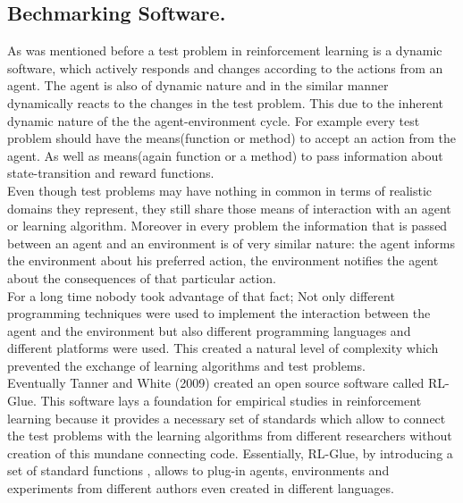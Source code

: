 \subsection{Bechmarking Software.}
As was mentioned before a test problem in reinforcement learning is a dynamic software, which actively responds and changes according to the actions from an agent. The agent is also of dynamic nature and in the similar manner dynamically reacts to the changes in the test problem. This due to the inherent dynamic nature of the the agent-environment cycle. For example every test problem should have the means(function or method) to accept an action from the agent. As well as means(again function or a method) to pass information about state-transition and reward functions. \\

Even though test problems may have nothing in common in terms of realistic domains they represent, they still share those means of interaction with an agent or learning algorithm. Moreover in every problem the information that is passed between an agent and an environment is of very similar nature: the agent informs the environment about his preferred action, the environment notifies the agent about the consequences of that particular action. \\

For a long time nobody took advantage of that fact; Not only different programming techniques were used to implement the interaction between the agent and the environment but also different programming languages and different platforms were used. This created a natural level of complexity which prevented the exchange of learning algorithms and test problems. \\

Eventually Tanner and White (2009)\cite{tanner2009rl} created an open source software called RL-Glue. This software lays a foundation for empirical studies in reinforcement learning because it provides a necessary set of standards which allow to connect the test problems with the learning algorithms from different researchers without creation of this mundane connecting code. Essentially, RL-Glue, by introducing a set of standard functions , allows to plug-in agents, environments and experiments from different authors even created in different languages. \\

